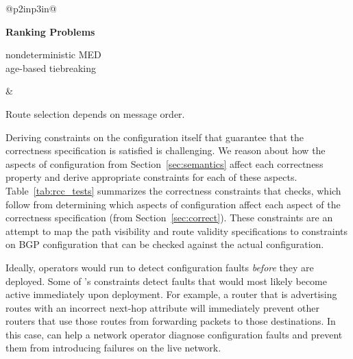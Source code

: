 \begin{table}[t]
\begin{center}
{\begin{tabular}{@{}p{2in}p{3in}@{}}
\hline\hline
{} \\ \hline


{\bf Ranking Problems} \\
\parbox{4in}{nondeterministic MED \\
age-based tiebreaking} 
& \parbox{4in}{Route selection depends on message order.}


\end{tabular}
}
\end{center}

\caption{BGP configuration problems that \rcc detects and their
potentially active faults.} 
\label{tab:rcc_tests}
\end{table}

Deriving constraints on the configuration itself that guarantee that the
correctness specification 
is satisfied is challenging. We reason about how the aspects of
configuration from Section~\ref{sec:semantics} affect each correctness
property and derive appropriate constraints for each of these aspects.
Table~\ref{tab:rcc_tests} summarizes the correctness
constraints that 
\rcc checks, which follow from determining which aspects of
configuration affect each aspect of the
correctness specification (from Section~\ref{sec:correct}).
These constraints are an attempt to map the path visibility and route
validity specifications to constraints on BGP configuration that can be
checked against the actual configuration.  


Ideally, operators would run \rcc to detect configuration faults {\em
before} they are deployed.  Some of \rccns's constraints detect faults
that would most likely become active immediately upon deployment.  For
example, a router that is advertising
routes with an incorrect next-hop attribute will immediately prevent
other routers that  
use those routes from forwarding packets to those
destinations.  In this case, \rcc can help a network operator diagnose
configuration faults and prevent them from introducing failures on the
live network.  

